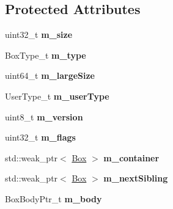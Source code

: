 \subsection*{Protected Attributes}
\begin{DoxyCompactItemize}
\item 
\mbox{\label{classmp4_parser_1_1_box_aad3a0e2e04c44bfa3dd66fb4ce646cfe}} 
uint32\+\_\+t {\bfseries m\+\_\+size}
\item 
\mbox{\label{classmp4_parser_1_1_box_a89014ae6e8ecfe9f72c54a8c0e96cfad}} 
Box\+Type\+\_\+t {\bfseries m\+\_\+type}
\item 
\mbox{\label{classmp4_parser_1_1_box_a9e4749724030f02c75ede8288a925437}} 
uint64\+\_\+t {\bfseries m\+\_\+large\+Size}
\item 
\mbox{\label{classmp4_parser_1_1_box_a63d66544d009cdaf37191e79bd2d50cc}} 
User\+Type\+\_\+t {\bfseries m\+\_\+user\+Type}
\item 
\mbox{\label{classmp4_parser_1_1_box_a95d77f7de52977144f4e66606418640f}} 
uint8\+\_\+t {\bfseries m\+\_\+version}
\item 
\mbox{\label{classmp4_parser_1_1_box_a1716979614f71ce04765effc02004080}} 
uint32\+\_\+t {\bfseries m\+\_\+flags}
\item 
\mbox{\label{classmp4_parser_1_1_box_a34de463278b8fb514a4c2428922f8e2d}} 
std\+::weak\+\_\+ptr$<$ \mbox{\hyperlink{classmp4_parser_1_1_box}{Box}} $>$ {\bfseries m\+\_\+container}
\item 
\mbox{\label{classmp4_parser_1_1_box_a1b4a9a7e3368c7856f28c5b8641c5ae2}} 
std\+::weak\+\_\+ptr$<$ \mbox{\hyperlink{classmp4_parser_1_1_box}{Box}} $>$ {\bfseries m\+\_\+next\+Sibling}
\item 
\mbox{\label{classmp4_parser_1_1_box_a653a235e702f85367422a193946a4d9e}} 
Box\+Body\+Ptr\+\_\+t {\bfseries m\+\_\+body}
\item 
\mbox{\label{classmp4_parser_1_1_box_a07d0b42f7982cd452653cc359ef5ca1a}} 

\end{DoxyCompactItemize}
